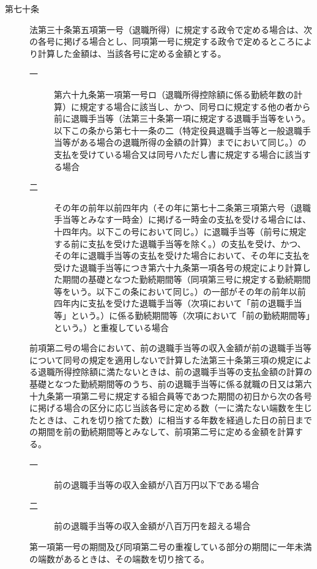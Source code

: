 \documentclass[twocolumn,a4j,10pt]{ltjtarticle}
\begin{document}
\begin{description}
\item[第七十条]法第三十条第五項第一号（退職所得）に規定する政令で定める場合は、次の各号に掲げる場合とし、同項第一号に規定する政令で定めるところにより計算した金額は、当該各号に定める金額とする。
\begin{description}
\item[一]第六十九条第一項第一号ロ（退職所得控除額に係る勤続年数の計算）に規定する場合に該当し、かつ、同号ロに規定する他の者から前に退職手当等（法第三十条第一項に規定する退職手当等をいう。以下この条から第七十一条の二（特定役員退職手当等と一般退職手当等がある場合の退職所得の金額の計算）までにおいて同じ。）の支払を受けている場合又は同号ハただし書に規定する場合に該当する場合
\item[二]その年の前年以前四年内（その年に第七十二条第三項第六号（退職手当等とみなす一時金）に掲げる一時金の支払を受ける場合には、十四年内。以下この号において同じ。）に退職手当等（前号に規定する前に支払を受けた退職手当等を除く。）の支払を受け、かつ、その年に退職手当等の支払を受けた場合において、その年に支払を受けた退職手当等につき第六十九条第一項各号の規定により計算した期間の基礎となつた勤続期間等（同項第三号に規定する勤続期間等をいう。以下この条において同じ。）の一部がその年の前年以前四年内に支払を受けた退職手当等（次項において「前の退職手当等」という。）に係る勤続期間等（次項において「前の勤続期間等」という。）と重複している場合
\end{description}
\item[]前項第二号の場合において、前の退職手当等の収入金額が前の退職手当等について同号の規定を適用しないで計算した法第三十条第三項の規定による退職所得控除額に満たないときは、前の退職手当等の支払金額の計算の基礎となつた勤続期間等のうち、前の退職手当等に係る就職の日又は第六十九条第一項第二号に規定する組合員等であつた期間の初日から次の各号に掲げる場合の区分に応じ当該各号に定める数（一に満たない端数を生じたときは、これを切り捨てた数）に相当する年数を経過した日の前日までの期間を前の勤続期間等とみなして、前項第二号に定める金額を計算する。
\begin{description}
\item[一]前の退職手当等の収入金額が八百万円以下である場合
\item[二]前の退職手当等の収入金額が八百万円を超える場合
\end{description}
\item[]第一項第一号の期間及び同項第二号の重複している部分の期間に一年未満の端数があるときは、その端数を切り捨てる。
\end{description}
\end{document}
